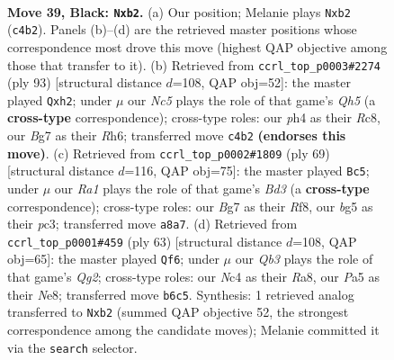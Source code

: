 \documentclass[11pt]{article}
\begin{document}
\clearpage

\begin{figure}[p]\centering
\begin{subfigure}{0.46\textwidth}\centering
\resizebox{\linewidth}{!}{%
\newchessgame
\chessboard[
  setfen={r1b1k3/6bp/1q2p3/p2p1pB1/P1np1Q1P/5N2/1P3P2/RN1R1K2 b - - 1 39},
  showmover=false,
  pgfstyle=straightmove, color=movearrow, markmove={c4-b2}
]}
\caption{}
\end{subfigure}\hfill
\begin{subfigure}{0.46\textwidth}\centering
\resizebox{\linewidth}{!}{%
\newchessgame
\chessboard[
  setfen={2r5/5p1k/1p1Qp2r/pPN1P2p/2P2npq/2R5/P1N1B2P/3R1K2 b - - 0 47},
  showmover=false,
  pgfstyle=straightmove, color=movearrow, markmove={h4-h2}
]}
\caption{}
\end{subfigure}
\\[4pt]
\begin{subfigure}{0.46\textwidth}\centering
\resizebox{\linewidth}{!}{%
\newchessgame
\chessboard[
  setfen={5r2/1p2q1pk/p2b3p/5p1P/3Np2n/2P1Q3/PPB2PP1/1R4K1 b - - 2 35},
  showmover=false,
  pgfstyle=straightmove, color=movearrow, markmove={d6-c5}
]}
\caption{}
\end{subfigure}\hfill
\begin{subfigure}{0.46\textwidth}\centering
\resizebox{\linewidth}{!}{%
\newchessgame
\chessboard[
  setfen={r3n1k1/2pb2q1/1p4pp/2pP4/2Pp1NPP/5P2/NQ2B3/1K3R2 b - - 1 32},
  showmover=false,
  pgfstyle=straightmove, color=movearrow, markmove={g7-f6}
]}
\caption{}
\end{subfigure}
\caption{\textbf{Move 39, Black: \texttt{Nxb2}.} (a) Our position; Melanie plays \texttt{Nxb2} (\texttt{c4b2}). Panels (b)--(d) are the retrieved master positions whose correspondence most drove this move (highest QAP objective among those that transfer to it). (b) Retrieved from \texttt{ccrl\_top\_p0003\#2274} (ply 93) [structural distance $d$=108, QAP obj=52]: the master played \texttt{Qxh2}; under $\mu$ our \emph{Nc5} plays the role of that game's \emph{Qh5} (a \textbf{cross-type} correspondence); cross-type roles: our \emph{p}h4 as their \emph{R}c8, our \emph{B}g7 as their \emph{R}h6; transferred move \texttt{c4b2} \textbf{(endorses this move)}. (c) Retrieved from \texttt{ccrl\_top\_p0002\#1809} (ply 69) [structural distance $d$=116, QAP obj=75]: the master played \texttt{Bc5}; under $\mu$ our \emph{Ra1} plays the role of that game's \emph{Bd3} (a \textbf{cross-type} correspondence); cross-type roles: our \emph{B}g7 as their \emph{R}f8, our \emph{b}g5 as their \emph{p}c3; transferred move \texttt{a8a7}. (d) Retrieved from \texttt{ccrl\_top\_p0001\#459} (ply 63) [structural distance $d$=108, QAP obj=65]: the master played \texttt{Qf6}; under $\mu$ our \emph{Qb3} plays the role of that game's \emph{Qg2}; cross-type roles: our \emph{N}c4 as their \emph{R}a8, our \emph{P}a5 as their \emph{N}e8; transferred move \texttt{b6c5}. Synthesis: 1 retrieved analog transferred to \texttt{Nxb2} (summed QAP objective 52, the strongest correspondence among the candidate moves); Melanie committed it via the \texttt{search} selector.}
\label{fig:thought-m77}
\end{figure}
\end{document}
